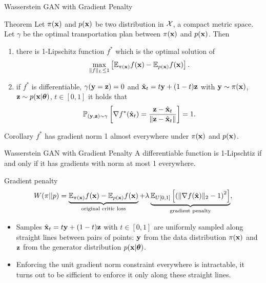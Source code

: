 \begin{frame}{Wasserstein GAN with Gradient Penalty}
	\begin{block}{Theorem}
		Let $\pi(\mathbf{x})$ and $p(\mathbf{x})$ be two distribution in $\mathcal{X}$, a compact metric space. Let $\gamma$ be the optimal transportation plan between $\pi(\mathbf{x})$ and $p(\mathbf{x})$. Then
		\begin{enumerate}
			\item there is 1-Lipschitz function $f^*$ which is the optimal solution of 
			\[
				\max_{\| f \|_L \leq 1} \left[ \mathbb{E}_{\pi(\mathbf{x})} f(\mathbf{x})  - \mathbb{E}_{p(\mathbf{x})} f(\mathbf{x})\right].
			\]
			\item if $f^*$ is differentiable, $\gamma(\mathbf{y} = \mathbf{z}) = 0$ and $\hat{\mathbf{x}}_t = t \mathbf{y} + (1 - t) \mathbf{z}$ with $\mathbf{y} \sim \pi(\mathbf{x})$, $\mathbf{z} \sim p(\mathbf{x} | \boldsymbol{\theta})$, $t \in [0, 1]$ it holds that
			\[
				\mathbb{P}_{(\mathbf{y}, \mathbf{z}) \sim \gamma} \left[ \nabla f^*(\hat{\mathbf{x}}_t) = \frac{\mathbf{z} - \hat{\mathbf{x}}_t}{\| \mathbf{z} - \hat{\mathbf{x}}_t \|} \right] = 1.
			\]
		\end{enumerate}
	\end{block}
	\vspace{-0.5cm}
	\begin{block}{Corollary}
		$f^*$ has gradient norm 1 almost everywhere under $\pi(\mathbf{x})$ and $p(\mathbf{x})$.
	\end{block}

\end{frame}
\begin{frame}{Wasserstein GAN with Gradient Penalty}
	A differentiable function is 1-Lipschtiz if and only if it has gradients with norm at most 1 everywhere.
	\begin{block}{Gradient penalty}
		\vspace{-0.3cm}
		\[
			W(\pi || p) = \underbrace{\mathbb{E}_{\pi(\mathbf{x})} f(\mathbf{x})  - \mathbb{E}_{p(\mathbf{x})} f(\mathbf{x})}_{\text{original critic loss}} + \lambda \underbrace{\mathbb{E}_{U[0, 1]} \left[ \left( \| \nabla f(\hat{\mathbf{x}}) \|_2 - 1 \right) ^ 2\right]}_{\text{gradient penalty}},
		\]
		\vspace{-0.3cm}
	\end{block}
	\begin{itemize}
		\item Samples $\hat{\mathbf{x}}_t = t \mathbf{y} + (1 - t) \mathbf{z}$ with $t \in [0, 1]$ are uniformly sampled along straight lines between pairs of points: $\mathbf{y}$ from the data distribution $\pi(\mathbf{x})$ and $\mathbf{z}$ from the generator distribution $p(\mathbf{x} | \boldsymbol{\theta})$.
		\item Enforcing the unit gradient norm constraint everywhere is intractable, it turns out to be sifficient to enforce it only along these straight lines.
	\end{itemize}

\end{frame}

